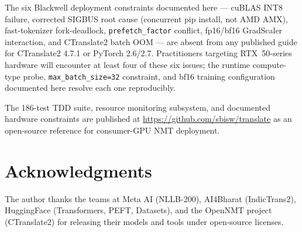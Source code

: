 \documentclass[conference]{IEEEtran}
\begin{document}
The six Blackwell deployment constraints documented here --- cuBLAS INT8 failure,
corrected SIGBUS root cause (concurrent pip install, not AMD AMX), fast-tokenizer
fork-deadlock, \texttt{prefetch\_factor} conflict, fp16/bf16 GradScaler interaction,
and CTranslate2 batch OOM --- are absent from any published guide for CTranslate2 4.7.1
or PyTorch 2.6/2.7. Practitioners targeting RTX~50-series hardware will encounter at
least four of these six issues; the runtime compute-type probe, \texttt{max\_batch\_size=32}
constraint, and bf16 training configuration documented here resolve each one
reproducibly.

The 186-test TDD suite, resource monitoring subsystem, and documented hardware
constraints are published at \url{https://github.com/sbisw/translate} as an
open-source reference for consumer-GPU NMT deployment.

\section*{Acknowledgments}

The author thanks the teams at Meta AI (NLLB-200), AI4Bharat (IndicTrans2),
HuggingFace (Transformers, PEFT, Datasets), and the OpenNMT project (CTranslate2)
for releasing their models and tools under open-source licenses.
\end{document}
